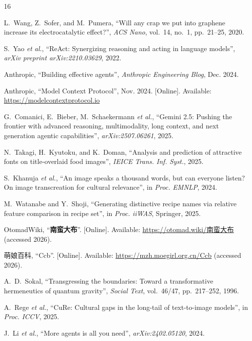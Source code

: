 \documentclass[journal]{IEEEtran}
\begin{document}
\begin{thebibliography}{16}

 L.~Wang, Z.~Sofer, and M.~Pumera, ``Will any crap we put into graphene increase its electrocatalytic effect?'', \textit{ACS Nano}, vol.~14, no.~1, pp.~21--25, 2020.

 S.~Yao \emph{et al.}, ``ReAct: Synergizing reasoning and acting in language models'', \textit{arXiv preprint arXiv:2210.03629}, 2022.

 Anthropic, ``Building effective agents'', \textit{Anthropic Engineering Blog}, Dec. 2024.

 Anthropic, ``Model Context Protocol'', Nov. 2024. [Online]. Available: \url{https://modelcontextprotocol.io}

 G.~Comanici, E.~Bieber, M.~Schaekermann \emph{et al.}, ``Gemini 2.5: Pushing the frontier with advanced reasoning, multimodality, long context, and next generation agentic capabilities'', \textit{arXiv:2507.06261}, 2025.

 N.~Takagi, H.~Kyutoku, and K.~Doman, ``Analysis and prediction of attractive fonts on title-overlaid food images'', \textit{IEICE Trans. Inf. Syst.}, 2025.

 S.~Khanuja \emph{et al.}, ``An image speaks a thousand words, but can everyone listen? On image transcreation for cultural relevance'', in \emph{Proc. EMNLP}, 2024.

 M.~Watanabe and Y.~Shoji, ``Generating distinctive recipe names via relative feature comparison in recipe set'', in \emph{Proc. iiWAS}, Springer, 2025.

 OtomadWiki, ``\textbf{南蛮大布}''. [Online]. Available: \url{https://otomad.wiki/南蛮大布} (accessed 2026).

 萌娘百科, ``Ccb''. [Online]. Available: \url{https://mzh.moegirl.org.cn/Ccb} (accessed 2026).

 A.~D.~Sokal, ``Transgressing the boundaries: Toward a transformative hermeneutics of quantum gravity'', \textit{Social Text}, vol.~46/47, pp.~217--252, 1996.

 A.~Rege \emph{et al.}, ``CuRe: Cultural gaps in the long-tail of text-to-image models'', in \emph{Proc. ICCV}, 2025.

 J.~Li \emph{et al.}, ``More agents is all you need'', \textit{arXiv:2402.05120}, 2024.


\end{thebibliography}
\end{document}
